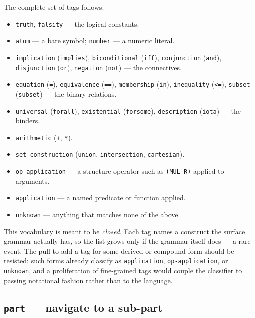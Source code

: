 \noindent
The complete set of tags follows.

\begin{itemize}
\item \texttt{truth}, \texttt{falsity} --- the logical constants.
\item \texttt{atom} --- a bare symbol; \texttt{number} --- a numeric literal.
\item \texttt{implication} (\texttt{implies}), \texttt{biconditional}
  (\texttt{iff}), \texttt{conjunction} (\texttt{and}), \texttt{disjunction}
  (\texttt{or}), \texttt{negation} (\texttt{not}) --- the connectives.
\item \texttt{equation} (\texttt{=}), \texttt{equivalence} (\texttt{==}),
  \texttt{membership} (\texttt{in}), \texttt{inequality} (\texttt{<=}),
  \texttt{subset} (\texttt{subset}) --- the binary relations.
\item \texttt{universal} (\texttt{forall}), \texttt{existential}
  (\texttt{forsome}), \texttt{description} (\texttt{iota}) --- the binders.
\item \texttt{arithmetic} (\texttt{+}, \texttt{*}).
\item \texttt{set-construction} (\texttt{union}, \texttt{intersection},
  \texttt{cartesian}).
\item \texttt{op-application} --- a structure operator such as
  \texttt{(MUL R)} applied to arguments.
\item \texttt{application} --- a named predicate or function applied.
\item \texttt{unknown} --- anything that matches none of the above.
\end{itemize}

\begin{remark}
This vocabulary is meant to be \emph{closed}.  Each tag names a construct
the surface grammar actually has, so the list grows only if the grammar
itself does --- a rare event.  The pull to add a tag for some derived or
compound form should be resisted: such forms already classify as
\texttt{application}, \texttt{op-application}, or \texttt{unknown}, and a
proliferation of fine-grained tags would couple the classifier to passing
notational fashion rather than to the language.
\end{remark}

\subsection{\texttt{part} --- navigate to a sub-part}

